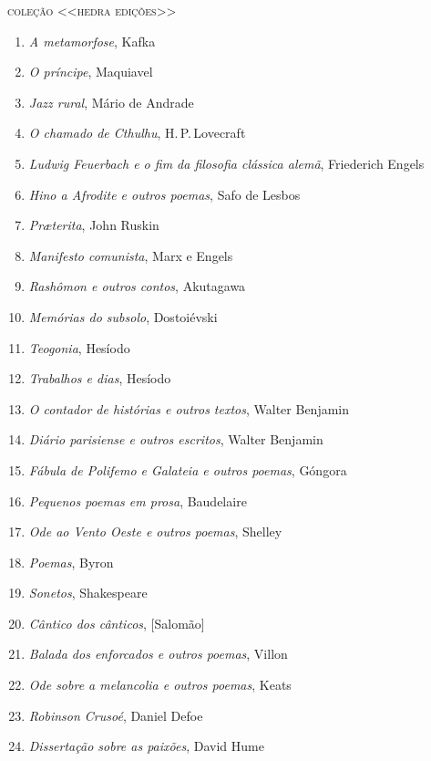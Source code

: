 \pagebreak
\blankpage

\pagestyle{empty}

\begingroup
\fontsize{7}{8}\selectfont
{\large\textsc{coleção <<hedra edições>>}}\\

\begin{enumerate}
\setlength\parskip{4.2pt}
\setlength\itemsep{-1.4mm}
\item \textit{A metamorfose}, Kafka
\item \textit{O príncipe}, Maquiavel
\item \textit{Jazz rural}, Mário de Andrade
\item \textit{O chamado de Cthulhu}, H.\,P.\,Lovecraft
\item \textit{Ludwig Feuerbach e o fim da filosofia clássica alemã}, Friederich Engels
\item \textit{Hino a Afrodite e outros poemas}, Safo de Lesbos 
\item \textit{Pr\ae terita}, John Ruskin
\item \textit{Manifesto comunista}, Marx e Engels
\item \textit{Rashômon e outros contos}, Akutagawa
\item \textit{Memórias do subsolo}, Dostoiévski
\item \textit{Teogonia}, Hesíodo
\item \textit{Trabalhos e dias}, Hesíodo
\item \textit{O contador de histórias e outros textos}, Walter Benjamin
\item \textit{Diário parisiense e outros escritos}, Walter Benjamin
\item \textit{Fábula de Polifemo e Galateia e outros poemas}, Góngora
\item \textit{Pequenos poemas em prosa}, Baudelaire
\item \textit{Ode ao Vento Oeste e outros poemas}, Shelley
\item \textit{Poemas}, Byron
\item \textit{Sonetos}, Shakespeare
\item \textit{Cântico dos cânticos}, [Salomão]
\item \textit{Balada dos enforcados e outros poemas}, Villon
\item \textit{Ode sobre a melancolia e outros poemas}, Keats
\item \textit{Robinson Crusoé}, Daniel Defoe
\item \textit{Dissertação sobre as paixões}, David Hume

\end{enumerate}
